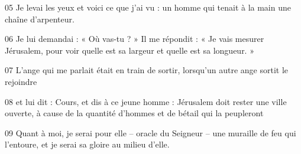05 Je levai les yeux et voici ce que j’ai vu : un homme qui tenait à la main une chaîne d’arpenteur.

06 Je lui demandai : « Où vas-tu ? » Il me répondit : « Je vais mesurer Jérusalem, pour voir quelle est sa largeur et quelle est sa longueur. »

07 L’ange qui me parlait était en train de sortir, lorsqu’un autre ange sortit le rejoindre

08 et lui dit : Cours, et dis à ce jeune homme : Jérusalem doit rester une ville ouverte, à cause de la quantité d’hommes et de bétail qui la peupleront

09 Quant à moi, je serai pour elle – oracle du Seigneur – une muraille de feu qui l’entoure, et je serai sa gloire au milieu d’elle.